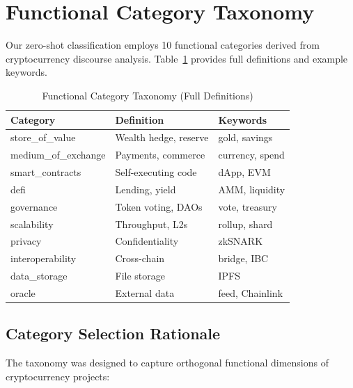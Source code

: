 \documentclass[11pt,twocolumn]{article}
\begin{document}
\section{Functional Category Taxonomy}
\label{app:taxonomy}

Our zero-shot classification employs 10 functional categories derived from cryptocurrency discourse analysis. Table~\ref{tab:taxonomy_full} provides full definitions and example keywords.

\begin{table}[H]
\centering
\small
\caption{Functional Category Taxonomy (Full Definitions)}
\label{tab:taxonomy_full}
\begin{tabular}{@{}lll@{}}
\toprule
\textbf{Category} & \textbf{Definition} & \textbf{Keywords} \\
\midrule
store\_of\_value & Wealth hedge, reserve & gold, savings \\
medium\_of\_exchange & Payments, commerce & currency, spend \\
smart\_contracts & Self-executing code & dApp, EVM \\
defi & Lending, yield & AMM, liquidity \\
governance & Token voting, DAOs & vote, treasury \\
scalability & Throughput, L2s & rollup, shard \\
privacy & Confidentiality & zkSNARK \\
interoperability & Cross-chain & bridge, IBC \\
data\_storage & File storage & IPFS \\
oracle & External data & feed, Chainlink \\
\bottomrule
\end{tabular}
\end{table}

\subsection{Category Selection Rationale}

The taxonomy was designed to capture orthogonal functional dimensions of cryptocurrency projects:
\end{document}
